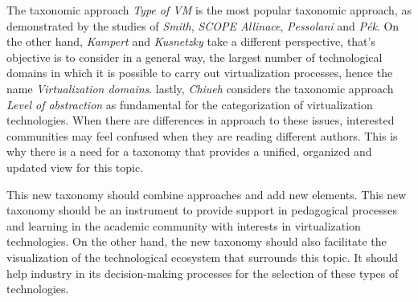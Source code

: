 	The taxonomic approach \textit{Type of VM} is the most popular taxonomic approach, as demonstrated by the studies of \textit{Smith}, \textit{SCOPE Allinace}, \textit{Pessolani} and \textit{P{\'e}k}. On the other hand, \textit{Kampert} and \textit{Kusnetzky} take a different perspective, that's objective is to consider in a general way, the largest number of technological domains in which it is possible to carry out virtualization processes, hence the name \textit{Virtualization domains}. lastly, \textit{Chiueh} considers the taxonomic approach \textit{Level of abstraction} as fundamental for the categorization of virtualization technologies. When there are differences in approach to these issues, interested communities may feel confused when they are reading different authors. This is why there is a need for a taxonomy that provides a unified, organized and updated view for this topic.
	
	
	This new taxonomy should combine approaches and add new elements. This new taxonomy should be an instrument to provide support in pedagogical processes and learning in the academic community with interests in virtualization technologies. On the other hand, the new taxonomy should also facilitate the visualization of the technological ecosystem that surrounds this topic. It should help industry in its decision-making processes for the selection of these types of technologies.
	
	
	
	
	
	
	

